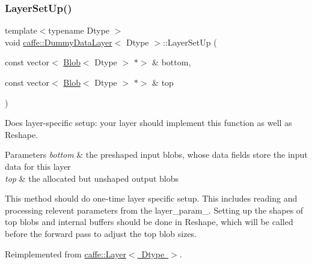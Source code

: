 \subsubsection{\texorpdfstring{Layer\+Set\+Up()}{LayerSetUp()}\hspace{0.1cm}{\footnotesize\ttfamily [1/2]}}
{\footnotesize\ttfamily template$<$typename Dtype $>$ \\
void \mbox{\hyperlink{classcaffe_1_1_dummy_data_layer}{caffe\+::\+Dummy\+Data\+Layer}}$<$ Dtype $>$\+::Layer\+Set\+Up (\begin{DoxyParamCaption}\item[{const vector$<$ \mbox{\hyperlink{classcaffe_1_1_blob}{Blob}}$<$ Dtype $>$ $\ast$$>$ \&}]{bottom,  }\item[{const vector$<$ \mbox{\hyperlink{classcaffe_1_1_blob}{Blob}}$<$ Dtype $>$ $\ast$$>$ \&}]{top }\end{DoxyParamCaption})\hspace{0.3cm}{\ttfamily [virtual]}}



Does layer-\/specific setup\+: your layer should implement this function as well as Reshape. 


\begin{DoxyParams}{Parameters}
{\em bottom} & the preshaped input blobs, whose data fields store the input data for this layer \\
\hline
{\em top} & the allocated but unshaped output blobs\\
\hline
\end{DoxyParams}
This method should do one-\/time layer specific setup. This includes reading and processing relevent parameters from the {\ttfamily layer\+\_\+param\+\_\+}. Setting up the shapes of top blobs and internal buffers should be done in {\ttfamily Reshape}, which will be called before the forward pass to adjust the top blob sizes. 

Reimplemented from \mbox{\hyperlink{classcaffe_1_1_layer_a481323a3e0972c682787f2137468c29f}{caffe\+::\+Layer$<$ Dtype $>$}}.

\mbox{\label{classcaffe_1_1_dummy_data_layer_a8bf93d8426b7053bd32de10cc6eb7207}} 
